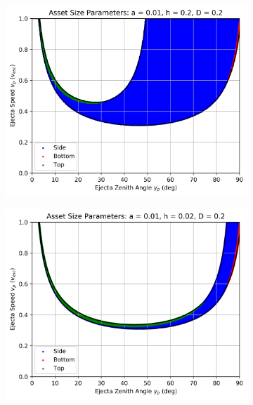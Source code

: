 \documentclass{article}
\begin{document}
\begin{figure}
	
	\begin{subfigure}[t]{.32\textwidth}
		\centering
		\includegraphics[width=.98\linewidth]{asset_speed_zenith_plot_1.010e+00_1.000e-02_2.000e-01_2.000e-01.png}  
		\label{fig:sub-asset_speed_zenith_h1_7}
	\end{subfigure}
	\begin{subfigure}[t]{.32\textwidth}
		\centering
		\includegraphics[width=.98\linewidth]{asset_speed_zenith_plot_1.010e+00_1.000e-02_2.000e-02_2.000e-01.png}  
		\label{fig:sub-asset_speed_zenith_h1_8}
	\end{subfigure}

\end{figure}
\end{document}
